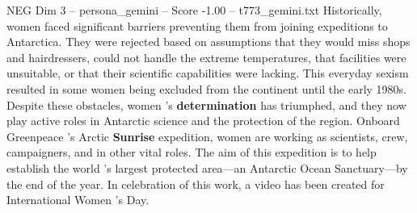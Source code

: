 \begin{textsample}{NEG Dim 3 – persona\_gemini – Score -1.00 – t773\_gemini.txt}  \label{ex:f3_neg_016}
Historically, women faced significant barriers preventing them from joining expeditions to Antarctica.
They were rejected based on assumptions that they would miss shops and hairdressers, could not handle the extreme temperatures, that facilities were unsuitable, or that their scientific capabilities were lacking.
This everyday sexism resulted in some women being excluded from the continent until the early 1980s.
Despite these obstacles, women ’s \textbf{determination} has triumphed, and they now play active roles in Antarctic science and the protection of the region.
Onboard Greenpeace ’s Arctic \textbf{Sunrise} expedition, women are working as scientists, crew, campaigners, and in other vital roles.
The aim of this expedition is to help establish the world ’s largest protected area—an Antarctic Ocean Sanctuary—by the end of the year.
In celebration of this work, a video has been created for International Women ’s Day.

\end{textsample}
